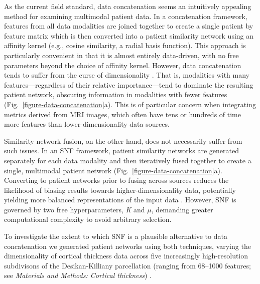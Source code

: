 \documentclass[12pt,aps,pra,reprint,showkeys]{revtex4-1}
\begin{document}
As the current field standard, data concatenation seems an intuitively appealing method for examining multimodal patient data.
In a concatenation framework, features from all data modalities are joined together to create a single patient by feature matrix which is then converted into a patient similarity network using an affinity kernel (e.g., cosine similarity, a radial basis function).
This approach is particularly convenient in that it is almost entirely data-driven, with no free parameters beyond the choice of affinity kernel.
However, data concatenation tends to suffer from the curse of dimensionality \citep{beyer1999nearest}.
That is, modalities with many features---regardless of their relative importance---tend to dominate the resulting patient network, obscuring information in modalities with fewer features (Fig.~\ref{figure-data-concatenation}a).
This is of particular concern when integrating metrics derived from MRI images, which often have tens or hundreds of time more features than lower-dimensionality data sources.

Similarity network fusion, on the other hand, does not necessarily suffer from such issues.
In an SNF framework, patient similarity networks are generated separately for each data modality and then iteratively fused together to create a single, multimodal patient network (Fig.~\ref{figure-data-concatenation}a).
Converting to patient networks prior to fusing across sources reduces the likelihood of biasing results towards higher-dimensionality data, potentially yielding more balanced representations of the input data \citep{wang2014similarity}.
However, SNF is governed by two free hyperparameters, \emph{K} and $\mu$, demanding greater computational complexity to avoid arbitrary selection.

To investigate the extent to which SNF is a plausible alternative to data concatenation we generated patient networks using both techniques, varying the dimensionality of cortical thickness data across five increasingly high-resolution subdivisons of the Desikan-Killiany parcellation (ranging from 68--1000 features; see \textit{Materials and Methods: Cortical thickness}) \citep{desikan2006automated}.
\end{document}
